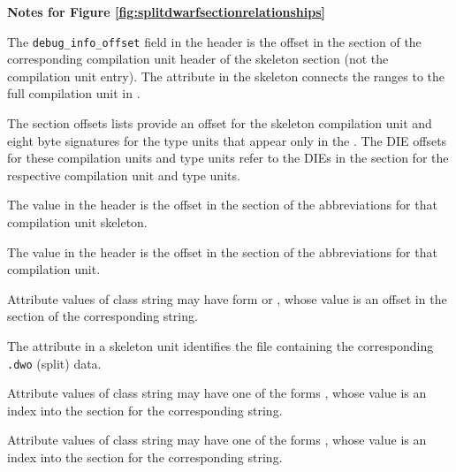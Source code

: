 \clearpage
\begin{center}
   \textbf{Notes for Figure \ref{fig:splitdwarfsectionrelationships}}
\end{center}
\begin{description}

The \texttt{debug\_info\_offset} field in the header is the
offset in the \dotdebuginfo{} section of the corresponding
compilation unit header of the skeleton \dotdebuginfo{} section
(not the compilation unit entry).  The \DWATdwoname{} attribute
in the \dotdebuginfo{} skeleton connects
the ranges to the full compilation unit in \dotdebuginfodwo.

The \dotdebugnames{} section  offsets lists provide an offset
for the skeleton compilation unit and eight
byte signatures for the type units that appear only in the
\dotdebuginfodwo. The DIE offsets for these
compilation units and type units refer to the DIEs in the
\dotdebuginfodwo{} section for the respective
compilation unit and type units.

The \HFNdebugabbrevoffset{} value in the header is
the offset in the \dotdebugabbrev{} section of the
abbreviations for that compilation unit skeleton.

The \HFNdebugabbrevoffset{} value in the header
is the offset in the \dotdebugabbrevdwo{} section of the
abbreviations for that compilation unit.

Attribute values of class string may have form \DWFORMstrp{}
\bb
or \DWFORMstrpeight{},
\eb
whose value is an offset in the
\dotdebugstr{} section of the corresponding string.

The \DWATdwoname{}
attribute in a skeleton unit identifies the file containing
the corresponding \texttt{.dwo} (split) data.

%

Attribute values of class string may have one of the forms
\DWFORMstrxXNor, whose value is an index into the
\dotdebugstroffsets{} section for the corresponding string.

Attribute values of class string may have one of the forms
\DWFORMstrxXNor, whose value is an index into the
\dotdebugstroffsetsdwo{} section for the corresponding string.


\end{description}
